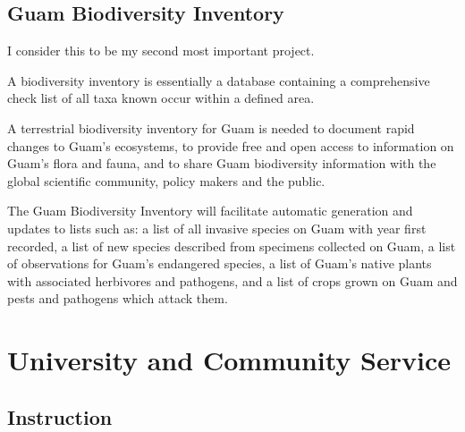 \documentclass[12pt,english]{scrartcl}
\begin{document}
\subsection{Guam Biodiversity Inventory}

I consider this to be my second most important project.

A biodiversity inventory is essentially a database containing a comprehensive
check list of all taxa known occur within a defined area.

A terrestrial biodiversity inventory for Guam is needed to document
rapid changes to Guam\textquoteright s ecosystems, to provide free
and open access to information on Guam\textquoteright s flora and
fauna, and to share Guam biodiversity information with the global
scientific community, policy makers and the public.

The Guam Biodiversity Inventory will facilitate automatic generation
and updates to lists such as: a list of all invasive species on Guam
with year first recorded, a list of new species described from specimens
collected on Guam, a list of observations for Guam\textquoteright s
endangered species, a list of Guam\textquoteright s native plants
with associated herbivores and pathogens, and a list of crops grown
on Guam and pests and pathogens which attack them.

\begin{comment}
\raggedright\vspace{2mm}\textbf{Activity}
\begin{itemize}
\item I made a couple of presentations on my plans for the Guam Biodiversity
Inventory \cite{moore2018building2,moore2018building}.
\item I designed data model for the Guam Biodiversity Inventory and created
a prototype web site.
\end{itemize}
\raggedright\vspace{2mm}\textbf{Reference(s)}

\begin{btSect}[vancouver]{zotero}
\btPrintCited
\end{btSect}
\end{comment}

\section{University and Community Service}

\subsection{Instruction}
\end{document}
